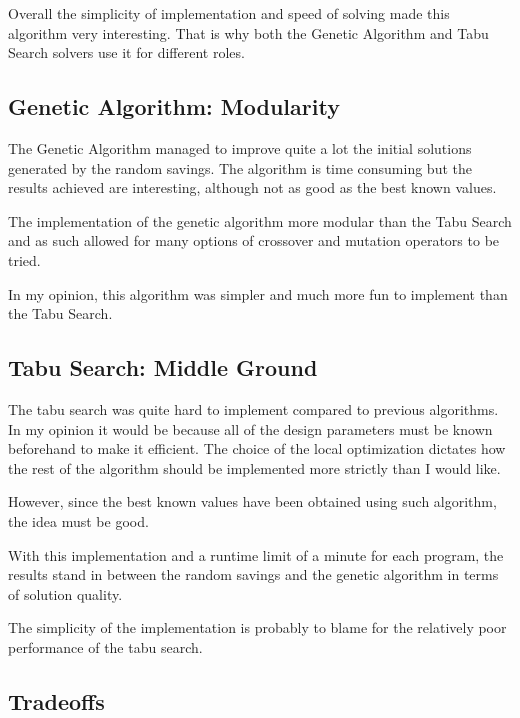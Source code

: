\documentclass{article} %
\begin{document}
Overall the simplicity of implementation and speed of solving made this algorithm very interesting. That is why both the Genetic Algorithm and Tabu Search solvers use it for different roles.



\subsection{Genetic Algorithm: Modularity}

The Genetic Algorithm managed to improve quite a lot the initial solutions generated by the random savings.
The algorithm is time consuming but the results achieved are interesting, although not as good as the best known values.\newline

The implementation of the genetic algorithm more modular than the Tabu Search and as such allowed for many options of crossover and mutation operators to be tried.\newline


In my opinion, this algorithm was simpler and much more fun to implement than the Tabu Search.


\subsection{Tabu Search: Middle Ground}

The tabu search was quite hard to implement compared to previous algorithms. In my opinion it would be because all of the design parameters must be known beforehand to make it efficient. The choice of the local optimization dictates how the rest of the algorithm should be implemented more strictly than I would like.\newline

However, since the best known values have been obtained using such algorithm, the idea must be good.\newline

With this implementation and a runtime limit of a minute for each program, the results stand in between the random savings and the genetic algorithm in terms of solution quality.\newline

The simplicity of the implementation is probably to blame for the relatively poor performance of the tabu search.


\subsection{Tradeoffs}
\end{document}
